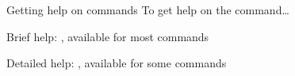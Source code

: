 \begin{block}{Getting help on commands}
  To get help on the  command\ldots \\[0.5ex]
  \begin{indented_itemize}
  \item Brief help: , available for most commands
  \item Detailed help: , available for some commands
  \end{indented_itemize}
\end{block}
